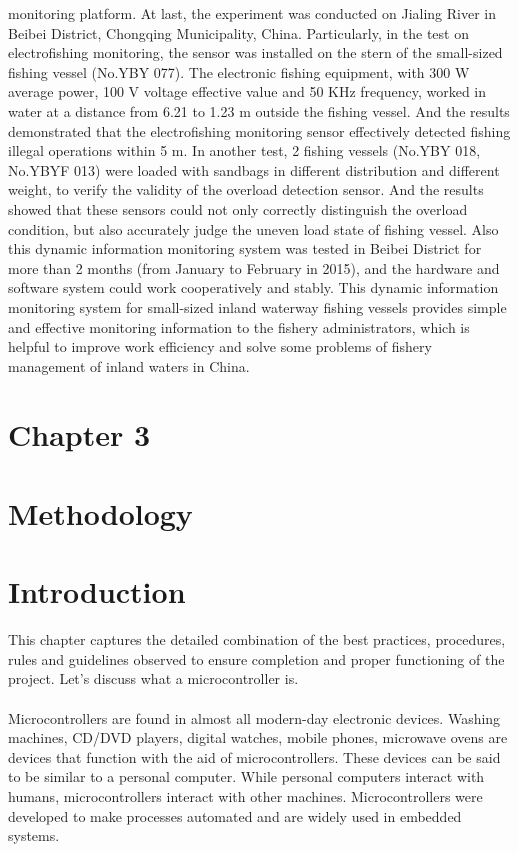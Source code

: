\documentclass[12pt]{article}
\begin{document}
monitoring platform. At last, the experiment was conducted on Jialing River in Beibei District, Chongqing Municipality, China. Particularly, in the test on electrofishing monitoring, the sensor was installed on the stern of the small-sized fishing vessel (No.YBY 077). The electronic fishing equipment, with 300 W average power, 100 V voltage effective value and 50 KHz frequency, worked in water at a distance from 6.21 to 1.23 m outside the fishing vessel. And the results demonstrated that the electrofishing monitoring sensor effectively detected fishing illegal operations within 5 m. In another test, 2 fishing vessels (No.YBY 018, No.YBYF 013) were loaded with sandbags in different distribution and different weight, to verify the validity of the overload detection sensor. And the results showed that these sensors could not only correctly distinguish the overload condition, but also accurately judge the uneven load state of fishing vessel. Also this dynamic information monitoring system was tested in Beibei District for more than 2 months (from January to February in 2015), and the hardware and software system could work cooperatively and stably. This dynamic information monitoring system for small-sized inland waterway fishing vessels provides simple and effective monitoring information to the fishery administrators, which is helpful to improve work efficiency and solve some problems of fishery management of inland waters in China.

\newpage

\begin{center} %
\section*{Chapter 3} 
\section*{Methodology}
\end{center} 

\section*{Introduction}
This chapter captures the detailed combination of the best practices, procedures, rules and guidelines observed to ensure completion and proper functioning of the project. Let’s discuss what a microcontroller is.
\paragraph*{}
	Microcontrollers are found in almost all modern-day electronic devices. Washing machines, CD/DVD players, digital watches, mobile phones, microwave ovens are devices that function with the aid of microcontrollers. These devices can be said to be similar to a personal computer. While personal computers interact with humans, microcontrollers interact with other machines. Microcontrollers were developed to make processes automated and are widely used in embedded systems.
\end{document}
